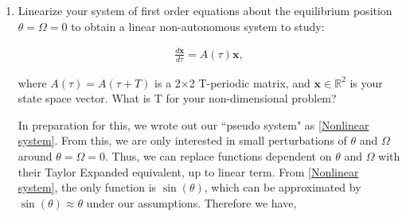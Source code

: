 \documentclass[12pt]{article}
\newcommand{\jump}{\vspace{5mm}}
\newcommand{\R}{\mathbb{R}}
\begin{document}
\begin{enumerate}[]
        \jump
        \centerline{\noindent}%
        \jump

        \item Linearize your system of first order equations about the equilibrium position $\theta = \Omega = 0$ to obtain a linear non-autonomous system to study:

        \begin{align}
            \frac{d\textbf{x}}{d\tau} = A(\tau)\textbf{x}, \label{Linearized system}
        \end{align}

        where $A(\tau) = A(\tau + T)$ is a 2$\times$2 T-periodic matrix, and $\textbf{x} \in \R^{2}$ is your state space vector. What is T for your non-dimensional problem?
        
        \jump

        \begin{solution}
        
            In preparation for this, we wrote out our ``pseudo system" as \ref{Nonlinear system}. From this, we are only interested in small perturbations of $\theta$ and $\Omega$ around $\theta = \Omega = 0$. Thus, we can replace functions dependent on $\theta$ and $\Omega$ with their Taylor Expanded equivalent, up to linear term. From \ref{Nonlinear system}, the only function is $\sin(\theta)$, which can be approximated by $\sin(\theta) \approx \theta$ under our assumptions. Therefore we have,


\end{solution}
\end{enumerate}
\end{document}
